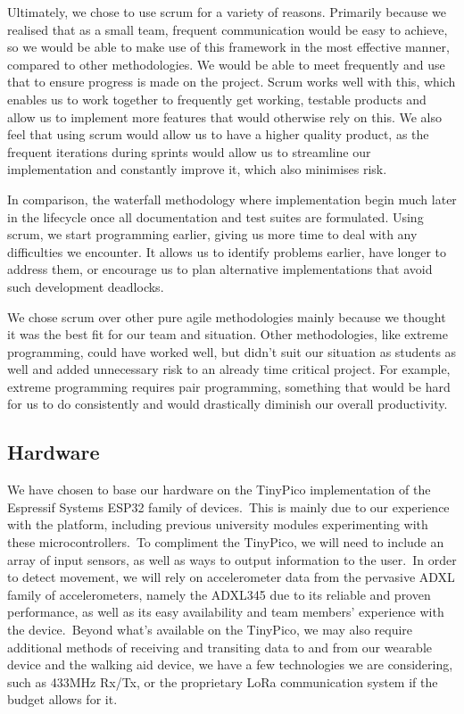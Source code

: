             Ultimately, we chose to use scrum for a variety of reasons. Primarily because we realised that as a small
            team, frequent communication would be easy to achieve, so we would be able to make use of this framework in
            the most effective manner, compared to other methodologies. We would be able to meet frequently and use that
            to ensure progress is made on the project. Scrum works well with this, which enables us to work together to
            frequently get working, testable products and allow us to implement more features that would otherwise rely
            on this. We also feel that using scrum would allow us to have a higher quality product, as the frequent
            iterations during sprints would allow us to streamline our implementation and constantly improve it, which
            also minimises risk.

            In comparison, the waterfall methodology where implementation begin much later in the lifecycle once all
            documentation and test suites are formulated. Using scrum, we start programming earlier, giving us more time
            to deal with any difficulties we encounter. It allows us to identify problems earlier, have longer to
            address them, or encourage us to plan alternative implementations that avoid such development deadlocks.

            We chose scrum over other pure agile methodologies mainly because we thought it was the best fit for our
            team and situation. Other methodologies, like extreme programming, could have worked well, but didn’t suit
            our situation as students as well and added unnecessary risk to an already time critical project. For
            example, extreme programming requires pair programming, something that would be hard for us to do
            consistently and would drastically diminish our overall productivity.

        \subsection{Hardware}
            We have chosen to base our hardware on the TinyPico implementation of the Espressif Systems ESP32 family of
            devices.\ This is mainly due to our experience with the platform, including previous university modules
            experimenting with these microcontrollers.\ To compliment the TinyPico, we will need to include an array of
            input sensors, as well as ways to output information to the user.\ In order to detect movement, we will rely
            on accelerometer data from the pervasive ADXL family of accelerometers, namely the ADXL345 due to its
            reliable and proven performance, as well as its easy availability and team members' experience with the
            device.\ Beyond what's available on the TinyPico, we may also require additional methods of receiving and
            transiting data to and from our wearable device and the walking aid device, we have a few technologies we
            are considering, such as 433MHz Rx/Tx, or the proprietary LoRa communication system if the budget allows for
            it.


